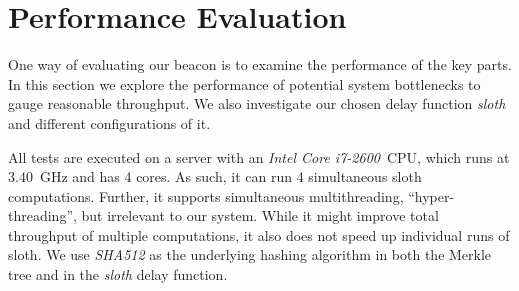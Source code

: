\section{Performance Evaluation}
One way of evaluating our beacon is to examine the performance of the key parts.
In this section we explore the performance of potential system bottlenecks to gauge reasonable throughput.
We also investigate our chosen delay function \textit{sloth} and different configurations of it.

All tests are executed on a server with an \textit{Intel Core i7-2600}~CPU, which runs at $3.40$~GHz and has 4 cores.
As such, it can run 4 simultaneous sloth computations.
Further, it supports simultaneous multithreading, \enquote{hyper-threading}, but irrelevant to our system.
While it might improve total throughput of multiple computations, it also does not speed up individual runs of sloth.
We use \textit{SHA512} as the underlying hashing algorithm in both the Merkle tree and in the \textit{sloth} delay function.

